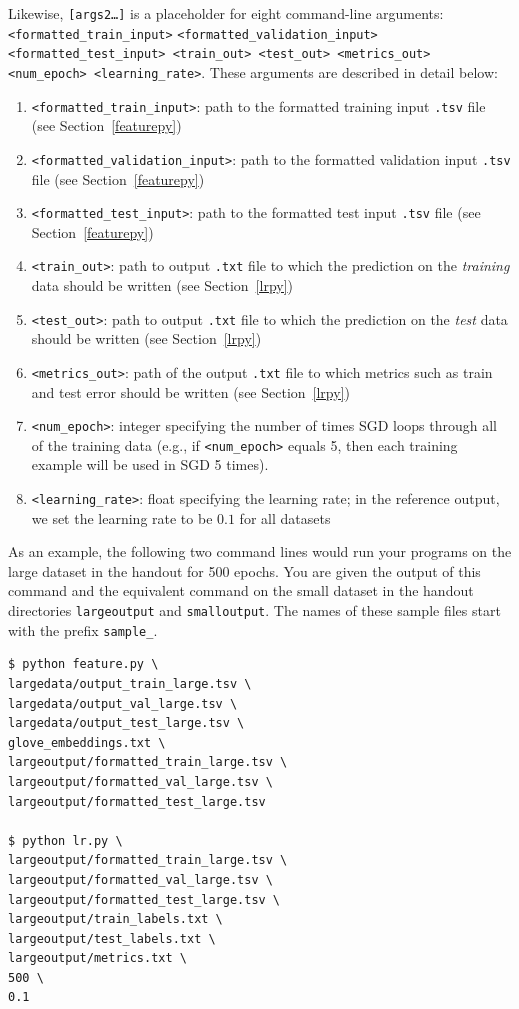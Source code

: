 \documentclass[11pt,addpoints,answers]{exam}
\begin{document}
Likewise, \texttt{[args2\dots]} is a placeholder for eight command-line arguments: \texttt{<formatted\_train\_input>} \texttt{<formatted\_validation\_input> <formatted\_test\_input> <train\_out> <test\_out> <metrics\_out> <num\_epoch> <learning\_rate>}. These arguments are described in detail below:
\begin{enumerate}
    \item \texttt{<formatted\_train\_input>}: path to the formatted training input \texttt{.tsv} file (see Section~\ref{featurepy})
    \item \texttt{<formatted\_validation\_input>}: path to the formatted validation input \texttt{.tsv} file (see Section~\ref{featurepy})
    \item \texttt{<formatted\_test\_input>}: path to the formatted test input \texttt{.tsv} file (see Section~\ref{featurepy})
    \item \texttt{<train\_out>}: path to output \texttt{.txt} file to which the prediction on the \emph{training} data should be written (see Section~\ref{lrpy})
    \item \texttt{<test\_out>}: path to output \texttt{.txt} file to which the prediction on the \emph{test} data should be written (see Section~\ref{lrpy})
    \item \texttt{<metrics\_out>}: path of the output \texttt{.txt} file to which metrics such as train and test error should be written (see Section~\ref{lrpy})
    \item \texttt{<num\_epoch>}: integer specifying the number of times SGD loops through all of the training data (e.g., if \texttt{<num\_epoch>} equals 5, then each training example will be used in SGD 5 times). 
    \item \texttt{<learning\_rate>}: float specifying the learning rate; in the reference output, we set the learning rate to be $0.1$ for all datasets
\end{enumerate}

As an example, the following two command lines would run your programs on the large dataset in the handout for 500 epochs. You are given the output of this command and the equivalent command on the small dataset in the handout directories \verb|largeoutput| and \verb|smalloutput|. The names of these sample files start with the prefix \verb|sample_|.

\begin{lstlisting}[language=Shell]
$ python feature.py \ 
largedata/output_train_large.tsv \
largedata/output_val_large.tsv \
largedata/output_test_large.tsv \
glove_embeddings.txt \
largeoutput/formatted_train_large.tsv \
largeoutput/formatted_val_large.tsv \
largeoutput/formatted_test_large.tsv

$ python lr.py \
largeoutput/formatted_train_large.tsv \
largeoutput/formatted_val_large.tsv \
largeoutput/formatted_test_large.tsv \
largeoutput/train_labels.txt \
largeoutput/test_labels.txt \
largeoutput/metrics.txt \
500 \
0.1
\end{lstlisting}
\end{document}
